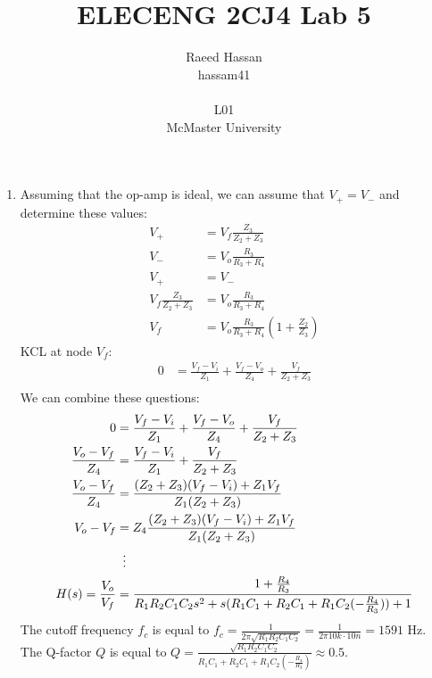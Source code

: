 \documentclass[12pt]{article}
\title{ELECENG 2CJ4 Lab 5}
\author{Raeed Hassan \\ hassam41 \\  \\ L01 \\ McMaster University}
\begin{document}
\maketitle
\pagebreak
\begin{enumerate}[label=\alph*)]
    \item
    Assuming that the op-amp is ideal, we can assume that $V_+ = V_-$ and determine these values:
    \[
    \begin{aligned}
        V_+ &= V_f\frac{Z_3}{Z_2+Z_3} \\
        V_- &= V_o\frac{R_3}{R_3+R_4} \\
        V_+ &= V_- \\
        V_f\frac{Z_3}{Z_2+Z_3} &= V_o\frac{R_3}{R_3+R_4} \\
        V_f &= V_o\frac{R_3}{R_3+R_4}(1+\frac{Z_2}{Z_3})
    \end{aligned}    
    \]
    KCL at node $V_f$:  
    \[
    \begin{aligned}
        0 &= \frac{V_f-V_i}{Z_1} + \frac{V_f-V_o}{Z_4} + \frac{V_f}{Z_2+Z_3} \\
    \end{aligned}    
    \]
    We can combine these questions:
    \[
    \begin{aligned}
        0 &= \frac{V_f-V_i}{Z_1} + \frac{V_f-V_o}{Z_4} + \frac{V_f}{Z_2+Z_3} \\
        \frac{V_o-V_f}{Z_4} &= \frac{V_f-V_i}{Z_1} + \frac{V_f}{Z_2+Z_3} \\
        \frac{V_o-V_f}{Z_4} &= \frac{(Z_2+Z_3)(V_f-V_i)+Z_1V_f}{Z_1(Z_2+Z_3)} \\
        V_o-V_f &= Z_4\frac{(Z_2+Z_3)(V_f-V_i)+Z_1V_f}{Z_1(Z_2+Z_3)} \\
        &\vdotswithin{=} \\ 
        H(s) = \frac{V_o}{V_f} &= \frac{1+\frac{R_4}{R_3}}{R_1R_2C_1C_2s^2+s(R_1C_1+R_2C_1+R_1C_2(-\frac{R_4}{R_3}))+1}
    \end{aligned}    
    \]
    The cutoff frequency $f_c$ is equal to $f_c = \frac{1}{2\pi\sqrt{R_1R_2C_1C_2}} = \frac{1}{2\pi 10k \cdot 10n} = 1591$ Hz.
    The Q-factor $Q$ is equal to $Q = \frac{\sqrt{R_1R_2C_1C_2}}{R_1C_1+R_2C_1+R_1C_2(-\frac{R_4}{R_3})} \approx 0.5$.
\end{enumerate}
\end{document}
